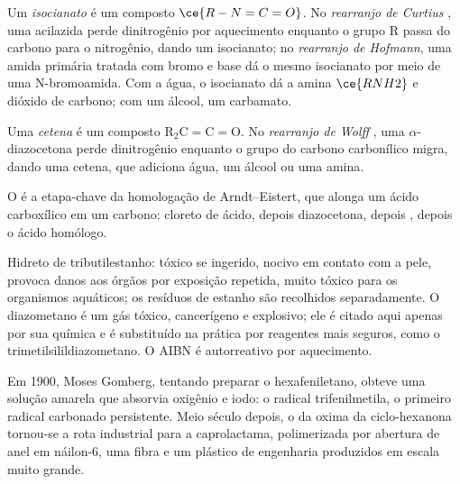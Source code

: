\begin{definition}\label{def:b3:radicals-carbenes:curtius}
Um \emph{isocianato} é um composto $\ce{R-N=C=O}$. No \emph{rearranjo de Curtius}%
, uma acilazida perde dinitrogênio por
aquecimento enquanto o grupo R passa do carbono para o nitrogênio, dando um isocianato;
no \emph{rearranjo de Hofmann}, uma amida primária
tratada com bromo e base dá o mesmo isocianato por meio de uma
N-bromoamida. Com a água, o isocianato dá a amina $\ce{RNH2}$ e dióxido de
carbono; com um álcool, um carbamato.
\end{definition}

\begin{definition}\label{def:b3:radicals-carbenes:wolff}
Uma \emph{cetena} é um composto $\mathrm{R_2C{=}C{=}O}$. No \emph{rearranjo de Wolff}%
, uma $\alpha$-diazocetona perde dinitrogênio
enquanto o grupo do carbono carbonílico migra, dando uma cetena, que adiciona
água, um álcool ou uma amina.
\end{definition}

O  é a etapa-chave da homologação de Arndt--Eistert,
que alonga um ácido carboxílico em um carbono: cloreto de ácido, depois
diazocetona, depois , depois o ácido homólogo.

\begin{safety}{}
Hidreto de tributilestanho: tóxico se ingerido, nocivo em contato com a pele, provoca danos aos órgãos por
exposição repetida, muito tóxico para os organismos aquáticos; os resíduos de estanho são recolhidos
separadamente. O diazometano é um gás tóxico, cancerígeno e explosivo; ele é
citado aqui apenas por sua química e é substituído na prática por reagentes mais seguros,
como o trimetilsilildiazometano. O AIBN é autorreativo por aquecimento.
\end{safety}

\begin{history}
Em 1900, Moses Gomberg, tentando preparar o hexafeniletano, obteve uma solução amarela
que absorvia oxigênio e iodo: o radical trifenilmetila, o primeiro
radical carbonado persistente. Meio século depois, o  da
oxima da ciclo-hexanona tornou-se a rota industrial para a caprolactama, polimerizada por
abertura de anel em náilon-6, uma fibra e um plástico de engenharia produzidos em escala
muito grande.
\end{history}

